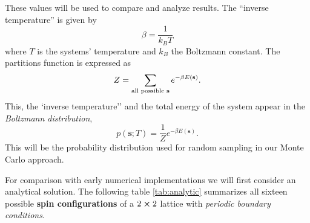 \documentclass[english,notitlepage,reprint,nofootinbib]{revtex4-1}  %
\begin{document}
These values will be used to compare and analyze results. The ``inverse temperature'' is given by
\begin{equation}
    \beta = \frac{1}{k_B T}
\end{equation}
where $T$ is the systems' temperature and $k_B$ the Boltzmann constant. The partitions function is expressed as
\begin{equation}
    Z = \sum_{\text{all possible \textbf{s}}} e^{- \beta E(\textbf{s})}.
\end{equation}
This, the `inverse temperature'' and the total energy of the system appear in the \textit{Boltzmann distribution},
\begin{equation}
    p(\textbf{s};T) = \frac{1}{Z} e^{-\beta E(\textbf{s})}.\label{eq:prob_dist}
\end{equation}
This will be the probability distribution used for random sampling in our Monte Carlo approach.


For comparison with early numerical implementations we will first consider an analytical solution. The following table \ref*{tab:analytic} summarizes all sixteen possible \textbf{spin configurations} of a $2 \cross 2$ lattice with \textit{periodic boundary conditions}.
\end{document}
